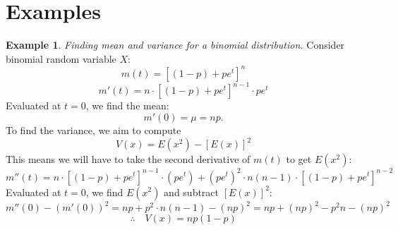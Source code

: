 \documentclass[a4paper]{article}
\theoremstyle{definition}
\newtheorem{exmp}{Example}[section]
\begin{document}
\section{Examples}
\begin{exmp}
\textit{Finding mean and variance for a binomial distribution.}
\bigbreak Consider binomial random variable $X$:
$$m(t)=[(1-p)+pe^t]^n$$
$$m'(t)=n\cdot[(1-p)+pe^t]^{n-1}\cdot pe^t$$
\quad \: Evaluated at $t=0$, we find the mean:
$$m'(0)=\mu = np.$$
\quad \: To find the variance, we aim to compute 
$$V(x) = E(x^2)-[E(x)]^2$$
\quad \: This means we will have to take the second derivative of $m(t)$ to get $E(x^2)$:
$$m''(t)=n\cdot[(1-p)+pe^t]^{n-1}\cdot (pe^t)+(pe^t)^2\cdot n(n-1)\cdot[(1-p)+pe^t]^{n-2}$$
\quad \: Evaluated at $t=0$, we find $E(x^2)$ and subtract $[E(x)]^2$: 
$$m''(0) - (m'(0))^2 = np+p^2\cdot n(n-1)-(np)^2=np+(np)^2-p^2n-(np)^2$$
$$\therefore \quad V(x) = np(1-p)$$
\end{exmp}
\end{document}
